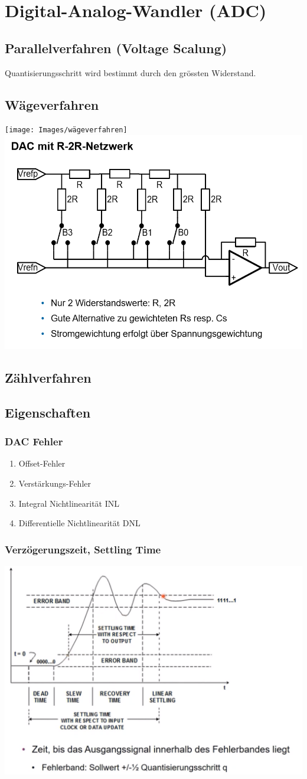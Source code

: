 \section{Digital-Analog-Wandler (ADC)}
\subsection{Parallelverfahren (Voltage Scalung)}
Quantisierungsschritt wird bestimmt durch den grössten Widerstand.

\subsection{Wägeverfahren}
\texttt{[image: Images/wägeverfahren]}
\includegraphics[width=\linewidth]{Images/r-2r}



\subsection{Zählverfahren}

\subsection{Eigenschaften}
\subsubsection{DAC Fehler}
\begin{enumerate}
	\item Offset-Fehler
	\item Verstärkungs-Fehler
	\item Integral Nichtlinearität INL
	\item Differentielle Nichtlinearität DNL
\end{enumerate}

\subsubsection{Verzögerungszeit, Settling Time}
\includegraphics[width=0.4\linewidth]{Images/settling_imte}

